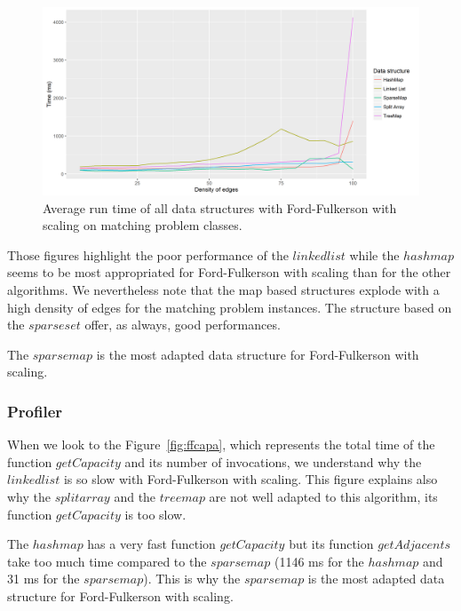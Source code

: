 \begin{figure}[H]
\begin{center}
\includegraphics[scale=0.55]{images/results/ffmeanmatching.png}
\caption{Average run time of all data structures with Ford-Fulkerson with scaling on matching problem classes.}
\label{fig:ffmeanmatching}
\end{center}
\end{figure}


Those figures highlight the poor performance of the $linked list$ while the $hash map$ seems to be most appropriated for Ford-Fulkerson with scaling than for the other algorithms. We nevertheless note that the map based structures explode with a high density of edges for the matching problem instances. The structure based on the $sparse set$ offer, as always, good performances. 

The $sparse map$ is the most adapted data structure for Ford-Fulkerson with scaling.

\subsubsection{Profiler}
When we look to the Figure~\ref{fig:ffcapa}, which represents the total time of the function $getCapacity$ and its number of invocations, we understand why the $linkedlist$ is so slow with Ford-Fulkerson with scaling. This figure explains also why the $split array$ and the $treemap$ are not well adapted to this algorithm, its function $getCapacity$ is too slow.

The $hashmap$ has a very fast function $getCapacity$ but its function $getAdjacents$ take too much time compared to the $sparsemap$ (1146 ms for the $hashmap$ and 31 ms for the $sparsemap$). This is why the $sparse map$ is the most adapted data structure for Ford-Fulkerson with scaling.

